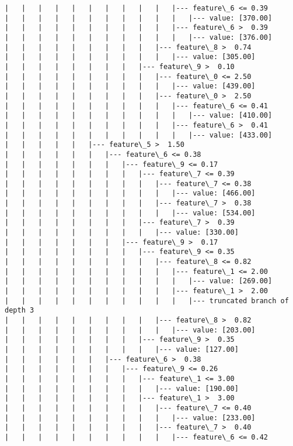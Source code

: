 \documentclass[11pt]{article}
\begin{document}
\begin{Verbatim}[commandchars=\\\{\}]
|   |   |   |   |   |   |   |   |   |   |--- feature\_6 <= 0.39
|   |   |   |   |   |   |   |   |   |   |   |--- value: [370.00]
|   |   |   |   |   |   |   |   |   |   |--- feature\_6 >  0.39
|   |   |   |   |   |   |   |   |   |   |   |--- value: [376.00]
|   |   |   |   |   |   |   |   |   |--- feature\_8 >  0.74
|   |   |   |   |   |   |   |   |   |   |--- value: [305.00]
|   |   |   |   |   |   |   |   |--- feature\_9 >  0.10
|   |   |   |   |   |   |   |   |   |--- feature\_0 <= 2.50
|   |   |   |   |   |   |   |   |   |   |--- value: [439.00]
|   |   |   |   |   |   |   |   |   |--- feature\_0 >  2.50
|   |   |   |   |   |   |   |   |   |   |--- feature\_6 <= 0.41
|   |   |   |   |   |   |   |   |   |   |   |--- value: [410.00]
|   |   |   |   |   |   |   |   |   |   |--- feature\_6 >  0.41
|   |   |   |   |   |   |   |   |   |   |   |--- value: [433.00]
|   |   |   |   |   |--- feature\_5 >  1.50
|   |   |   |   |   |   |--- feature\_6 <= 0.38
|   |   |   |   |   |   |   |--- feature\_9 <= 0.17
|   |   |   |   |   |   |   |   |--- feature\_7 <= 0.39
|   |   |   |   |   |   |   |   |   |--- feature\_7 <= 0.38
|   |   |   |   |   |   |   |   |   |   |--- value: [466.00]
|   |   |   |   |   |   |   |   |   |--- feature\_7 >  0.38
|   |   |   |   |   |   |   |   |   |   |--- value: [534.00]
|   |   |   |   |   |   |   |   |--- feature\_7 >  0.39
|   |   |   |   |   |   |   |   |   |--- value: [330.00]
|   |   |   |   |   |   |   |--- feature\_9 >  0.17
|   |   |   |   |   |   |   |   |--- feature\_9 <= 0.35
|   |   |   |   |   |   |   |   |   |--- feature\_8 <= 0.82
|   |   |   |   |   |   |   |   |   |   |--- feature\_1 <= 2.00
|   |   |   |   |   |   |   |   |   |   |   |--- value: [269.00]
|   |   |   |   |   |   |   |   |   |   |--- feature\_1 >  2.00
|   |   |   |   |   |   |   |   |   |   |   |--- truncated branch of depth 3
|   |   |   |   |   |   |   |   |   |--- feature\_8 >  0.82
|   |   |   |   |   |   |   |   |   |   |--- value: [203.00]
|   |   |   |   |   |   |   |   |--- feature\_9 >  0.35
|   |   |   |   |   |   |   |   |   |--- value: [127.00]
|   |   |   |   |   |   |--- feature\_6 >  0.38
|   |   |   |   |   |   |   |--- feature\_9 <= 0.26
|   |   |   |   |   |   |   |   |--- feature\_1 <= 3.00
|   |   |   |   |   |   |   |   |   |--- value: [190.00]
|   |   |   |   |   |   |   |   |--- feature\_1 >  3.00
|   |   |   |   |   |   |   |   |   |--- feature\_7 <= 0.40
|   |   |   |   |   |   |   |   |   |   |--- value: [233.00]
|   |   |   |   |   |   |   |   |   |--- feature\_7 >  0.40
|   |   |   |   |   |   |   |   |   |   |--- feature\_6 <= 0.42

\end{Verbatim}
\end{document}
